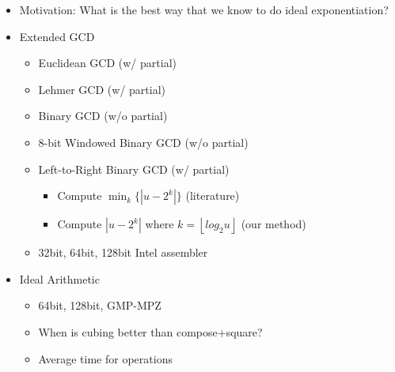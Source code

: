 \documentclass[11pt, letterpaper]{article}
\theoremstyle{definition}
\newcommand{\floor}[1]{\left\lfloor #1 \right\rfloor}
\begin{document}
\begin{itemize}
\item Motivation: What is the best way that we know to do ideal exponentiation?  

\item Extended GCD
	\begin{itemize}
	\item Euclidean GCD (w/ partial)
	\item Lehmer GCD (w/ partial)
	\item Binary GCD (w/o partial)
	\item 8-bit Windowed Binary GCD (w/o partial)
	\item Left-to-Right Binary GCD (w/ partial)
		\begin{itemize}
		\item Compute $\min_k \{ |u-2^k| \}$ (literature)
		\item Compute $|u-2^k|$ where $k=\floor{log_2 u}$ (our method)
		\end{itemize}
	\item 32bit, 64bit, 128bit Intel assembler
	\end{itemize}
	
	
\item Ideal Arithmetic
	\begin{itemize}
	\item 64bit, 128bit, GMP-MPZ
	\item When is cubing better than compose+square?
	\item Average time for operations
	\end{itemize}	
	

\end{itemize}
\end{document}
